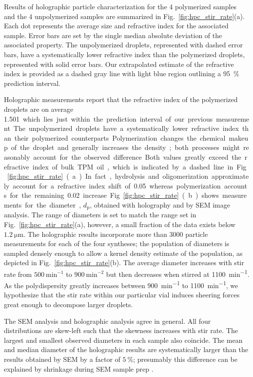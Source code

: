 Results of holographic particle characterization for the \num{4} polymerized samples
and the \num{4} unpolymerized samples are summarized in Fig.~\ref{fig:hpc_stir_rate}(a).
Each dot represents the average size and refractive index for the associated sample.
Error bars are set by the single median absolute deviation of the associated property.
The unpolymerized droplets, represented with dashed error bars, have a systematically
lower refractive index than the polymerized droplets, represented with solid error bars.
Our extrapolated estimate of the refractive index is provided as a dashed gray
line with light blue region outlining a \SI{95}{\percent} prediction interval.

Holographic measurements report that the refractive index of the polymerized droplets
are on average \SI{1.501} which lies just within the prediction interval of our
previous measurement. The unpolymerized droplets have a systematically lower
refractive index than their polymerized counterparts.
Polymerization changes the chemical makeup of the droplet and generally increases the
density; %
both processes might reasonably account for the observed difference.
Both values greatly exceed the refractive index of bulk TPM oil, which is indicated by
a dashed line in Fig.~\ref{fig:hpc_stir_rate}(a).
In fact, hydrolysis and oligomerization approximately account for a refractive
index shift of \SI{0.05} whereas polymerization accounts for the remaining \SI{0.02}
increase.

Fig.~\ref{fig:hpc_stir_rate}(b) shows measurements for the diameter, $d_{\text{p}}$,
obtained with holography and by SEM image analysis. The range of diameters is set to
match the range set in Fig.~\ref{fig:hpc_stir_rate}(a), however, a small fraction of the data
exists below $\SI{1.2}{\um}$. The holographic results incorporate
more than \num{3000} particle measurements for each of the four syntheses; the population
of diameters is sampled densely enough to allow a kernel density estimate of the population,
as depicted in Fig.~\ref{fig:hpc_stir_rate}(b). The average diameter increases with stir
rate from $\SI{500}{\minute^{-1}}$ to $\SI{900}{\minute^{-2}}$ but then decreases when
stirred at \SI{1100}{\minute^{-1}}. As the polydispersity greatly increases between
\SI{900}{\minute^{-1}} to \SI{1100}{\minute^{-1}}, we hypothesize that the stir rate within
our particular vial induces sheering forces great enough to decompose larger droplets.

The SEM analysis and holographic analysis agree in general. All four distributions are
skew-left such that the skewness increases with stir rate. The largest and smallest
observed diameters in each sample also coincide. The mean and median diameter
of the holographic results are systematically larger than the results obtained by
SEM by a factor of $\SI{5}{\percent}$; presumably this difference can be explained
by shrinkage during SEM sample prep \cite{yamada85,jung02}.


